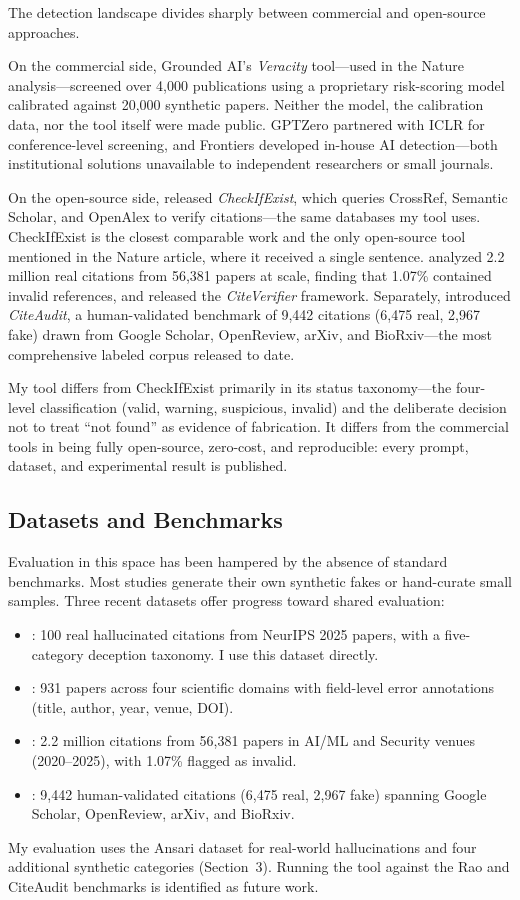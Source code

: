 The detection landscape divides sharply between commercial and open-source approaches.

On the commercial side, Grounded AI's \emph{Veracity} tool---used in the Nature analysis---screened over 4{,}000 publications using a proprietary risk-scoring model calibrated against 20{,}000 synthetic papers. Neither the model, the calibration data, nor the tool itself were made public. GPTZero partnered with ICLR for conference-level screening, and Frontiers developed in-house AI detection---both institutional solutions unavailable to independent researchers or small journals.

On the open-source side, \citet{abbonato2026} released \emph{CheckIfExist}, which queries CrossRef, Semantic Scholar, and OpenAlex to verify citations---the same databases my tool uses. CheckIfExist is the closest comparable work and the only open-source tool mentioned in the Nature article, where it received a single sentence. \citet{ghostcite2026} analyzed 2.2 million real citations from 56{,}381 papers at scale, finding that 1.07\% contained invalid references, and released the \emph{CiteVerifier} framework. Separately, \citet{citeaudit2026} introduced \emph{CiteAudit}, a human-validated benchmark of 9{,}442 citations (6{,}475 real, 2{,}967 fake) drawn from Google Scholar, OpenReview, arXiv, and BioRxiv---the most comprehensive labeled corpus released to date.

My tool differs from CheckIfExist primarily in its status taxonomy---the four-level classification (valid, warning, suspicious, invalid) and the deliberate decision not to treat ``not found'' as evidence of fabrication. It differs from the commercial tools in being fully open-source, zero-cost, and reproducible: every prompt, dataset, and experimental result is published.

\subsection{Datasets and Benchmarks}

Evaluation in this space has been hampered by the absence of standard benchmarks. Most studies generate their own synthetic fakes or hand-curate small samples. Three recent datasets offer progress toward shared evaluation:

\begin{itemize}
  \item \citet{ansari2025}: 100 real hallucinated citations from NeurIPS 2025 papers, with a five-category deception taxonomy. I use this dataset directly.
  \item \citet{rao2026}: 931 papers across four scientific domains with field-level error annotations (title, author, year, venue, DOI).
  \item \citet{ghostcite2026}: 2.2 million citations from 56{,}381 papers in AI/ML and Security venues (2020--2025), with 1.07\% flagged as invalid.
  \item \citet{citeaudit2026}: 9{,}442 human-validated citations (6{,}475 real, 2{,}967 fake) spanning Google Scholar, OpenReview, arXiv, and BioRxiv.
\end{itemize}

\noindent My evaluation uses the Ansari dataset for real-world hallucinations and four additional synthetic categories (Section~3). Running the tool against the Rao \citep{rao2026} and CiteAudit \citep{citeaudit2026} benchmarks is identified as future work.
